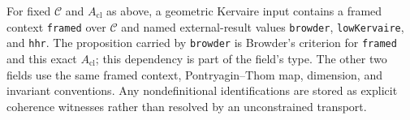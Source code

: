 \begin{definition}
  \label{def:geometric-kervaire-input}
  \notready
  For fixed $\mathcal C$ and $A_{\mathrm{cl}}$ as above, a geometric Kervaire
  input contains a framed context \texttt{framed} over $\mathcal C$ and named
  external-result values \texttt{browder}, \texttt{lowKervaire}, and
  \texttt{hhr}.  The proposition carried by \texttt{browder} is
  Browder's criterion for \texttt{framed} and this exact
  $A_{\mathrm{cl}}$; this dependency is part of the field's type.  The other two
  fields use the same framed context, Pontryagin--Thom map, dimension, and
  invariant conventions.  Any nondefinitional identifications are stored as
  explicit coherence witnesses rather than resolved by an unconstrained
  transport.
\end{definition}


